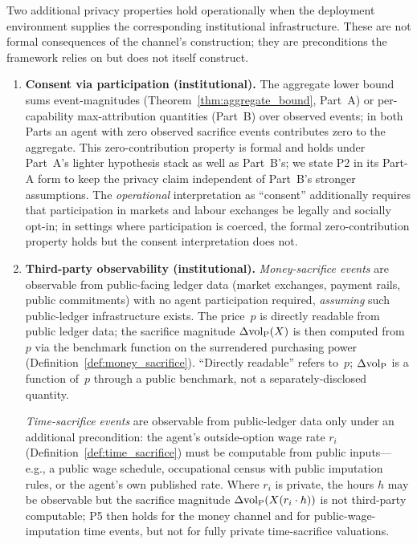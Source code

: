 \begin{proposition}
\label{prop:privacy_institutional}
Two additional privacy properties hold operationally when the
deployment environment supplies the corresponding institutional
infrastructure.  These are not formal consequences of the
channel's construction; they are preconditions the framework
relies on but does not itself construct.

\begin{enumerate}
\item[\textbf{(P2)}] \textbf{Consent via participation
  (institutional).}
  The aggregate lower bound sums event-magnitudes
  (Theorem~\ref{thm:aggregate_bound}, Part~A) or per-capability
  max-attribution quantities (Part~B) over observed events; in
  both Parts an agent with zero observed sacrifice events
  contributes zero to the aggregate.  This zero-contribution
  property is formal and holds under Part~A's lighter
  hypothesis stack as well as Part~B's; we state P2 in its
  Part-A form to keep the privacy claim independent of
  Part~B's stronger assumptions.  The \emph{operational}
  interpretation as ``consent'' additionally requires that
  participation in markets and labour exchanges be legally and
  socially opt-in; in settings where participation is coerced,
  the formal zero-contribution property holds but the consent
  interpretation does not.

\item[\textbf{(P5)}] \textbf{Third-party observability
  (institutional).}
  \emph{Money-sacrifice events} are observable from
  public-facing ledger data (market exchanges, payment rails,
  public commitments) with no agent participation required,
  \emph{assuming} such public-ledger infrastructure exists.  The
  price~$p$ is directly readable from public ledger data; the
  sacrifice magnitude $\Delta{\operatorname{vol}_{\mathrm{P}}}(X)$ is then computed from~$p$
  via the benchmark function on the surrendered purchasing
  power (Definition~\ref{def:money_sacrifice}).  ``Directly
  readable'' refers to~$p$; $\Delta{\operatorname{vol}_{\mathrm{P}}}$ is a function of~$p$
  through a public benchmark, not a separately-disclosed
  quantity.

  \emph{Time-sacrifice events} are observable from public-ledger
  data only under an additional precondition: the agent's
  outside-option wage rate $r_i$ (Definition~\ref{def:time_sacrifice})
  must be computable from public inputs---e.g., a public wage
  schedule, occupational census with public imputation rules, or
  the agent's own published rate.  Where $r_i$ is private, the
  hours $h$ may be observable but the sacrifice magnitude
  $\Delta{\operatorname{vol}_{\mathrm{P}}}(X(r_i \cdot h))$ is not third-party computable;
  P5 then holds for the money channel and for
  public-wage-imputation time events, but not for fully private
  time-sacrifice valuations.


\end{enumerate}
\end{proposition}
